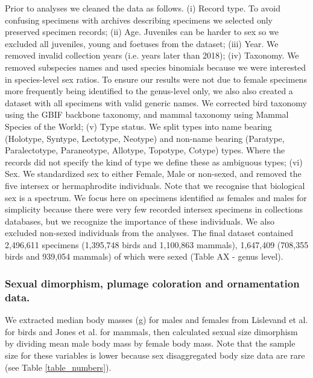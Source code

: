 \documentclass[a4paper, 12pt]{article}
\begin{document}
Prior to analyses we cleaned the data as follows. 
(i) Record type. To avoid confusing specimens with archives describing specimens we selected only preserved specimen records; 
(ii) Age. Juveniles can be harder to sex so we excluded all juveniles, young and foetuses from the dataset; 
(iii) Year. We removed invalid collection years (i.e. years later than 2018); 
(iv) Taxonomy. We removed subspecies names and used species binomials because we were interested in species-level sex ratios. 
To ensure our results were not due to female specimens more frequently being identified to the genus-level only, we also also created a dataset with all specimens with valid generic names.
We corrected bird taxonomy using the GBIF backbone taxonomy\cite{gbif}, and mammal taxonomy using Mammal Species of the World\cite{wilson2005mammal}; 
(v) Type status. We split types into name bearing (Holotype, Syntype, Lectotype, Neotype) and non-name bearing (Paratype, Paralectotype, Paraneotype, Allotype, Topotype, Cotype) types. Where the records did not specify the kind of type we define these as ambiguous types; 
(vi) Sex. We standardized sex to either Female, Male or non-sexed, and removed the five intersex or hermaphrodite individuals. 
Note that we recognise that biological sex is a spectrum\cite{sciam2017}. 
We focus here on specimens identified as females and males for simplicity because there were very few recorded intersex specimens in collections databases, but we recognize the importance of these individuals.
We also excluded non-sexed individuals from the analyses.
The final dataset contained 2,496,611 specimens (1,395,748 birds and 1,100,863 mammals), 1,647,409 (708,355 birds and 939,054 mammals) of which were sexed (Table AX - genus level).

\subsubsection{Sexual dimorphism, plumage coloration and ornamentation data.}
We extracted median body masses (g) for males and females from Lislevand et al.\cite{lislevand2007avian} for birds and Jones et al.\cite{pantheria} for mammals, then calculated sexual size dimorphism by dividing mean male body mass by female body mass. 
Note that the sample size for these variables is lower because sex disaggregated body size data are rare (see Table \ref{table_numbers}).
\end{document}
